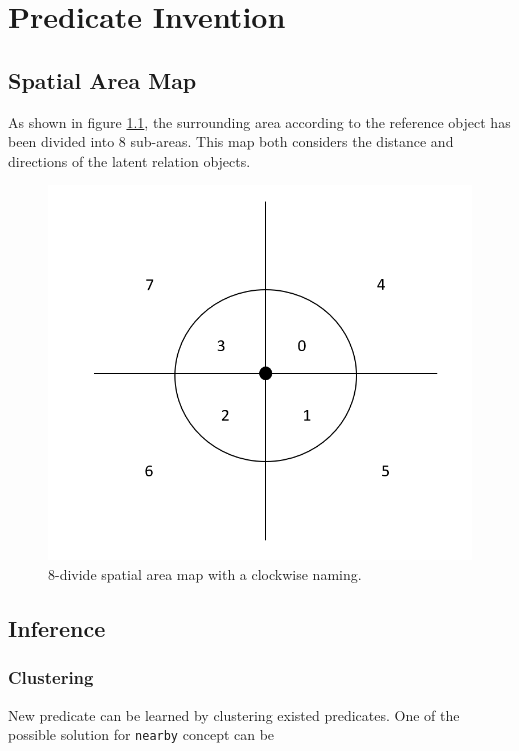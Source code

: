 

\chapter{Predicate Invention}


\section{Spatial Area Map}
As shown in figure \ref{fig:8-area}, the surrounding area according to the reference object has been divided into 8 sub-areas.
This map both considers the distance and directions of the latent relation objects.


\begin{figure}
    \centering
    \includegraphics[width=\linewidth]{img/area_8}
    \caption{8-divide spatial area map with a clockwise naming.}
    \label{fig:8-area}
\end{figure}


\section{Inference}

\subsection{Clustering}
New predicate can be learned by clustering existed predicates.
One of the possible solution for \texttt{nearby} concept can be

